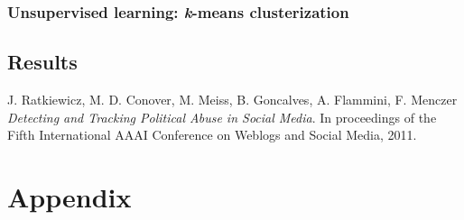 \documentclass[a4paper,12pt]{article}
\begin{document}
   	\subsubsection{Unsupervised learning: {\textit k-means} clusterization }
   	
   	\subsection{Results}
    
   
    \clearpage
    
    \begin{thebibliography}{9}
    	
        J. Ratkiewicz, M. D. Conover, M. Meiss, B. Goncalves, A. Flammini, F. Menczer
        \textit{Detecting and Tracking Political Abuse in Social Media}. 
        In proceedings of the Fifth International AAAI Conference on Weblogs and Social Media, 2011.    
    
    \end{thebibliography}
        
    \clearpage
    
      
	\appendix
	\section{Appendix}
    
    
\end{document}
